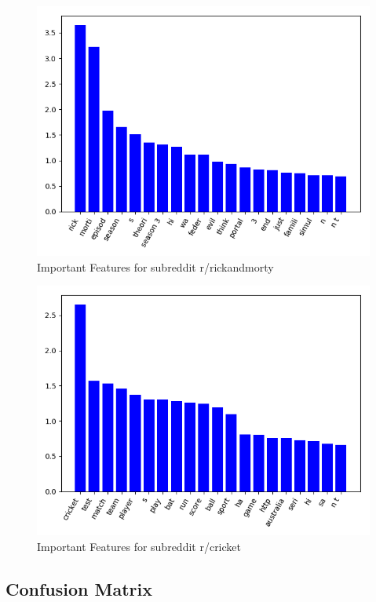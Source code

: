 \documentclass{sig-alternate-05-2015}
\begin{document}
\begin{figure}[H]
\centering
\includegraphics[width=\linewidth]{plots/coefficients-rickandmorty-dim-713.png}
\caption{Important Features for subreddit r/rickandmorty}
\label{fig:featureImportanceRickAndMorty}
\end{figure}

\begin{figure}[H]
\centering
\includegraphics[width=\linewidth]{plots/coefficients-cricket-dim-200.png}
\caption{Important Features for subreddit r/cricket}
\label{fig:featureImportanceCricket}
\end{figure}

\subsection{Confusion Matrix}
\end{document}
